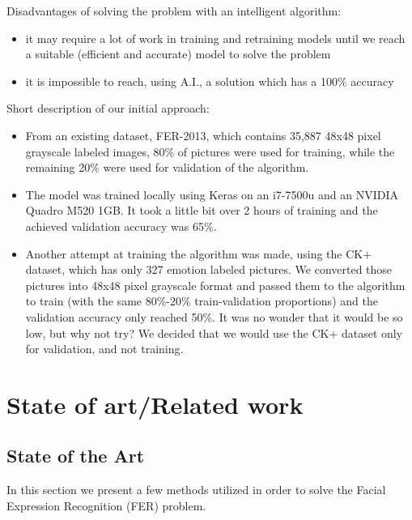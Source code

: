\documentclass[runningheads,a4paper,11pt]{report}
\begin{document}
Disadvantages of solving the problem with an intelligent algorithm:
\begin{itemize}
	\item it may require a lot of work in training and retraining models until we reach a suitable (efficient and accurate) model to solve the problem
	\item it is impossible to reach, using A.I., a solution which has a 100\% accuracy
\end{itemize}

\pagebreak
Short description of our initial approach:
\begin{itemize}
	\item From an existing dataset, FER-2013, which contains 35,887 48x48 pixel grayscale labeled images, 80\% of pictures were used for training, while the remaining 20\% were used for validation of the algorithm.
	\item The model was trained locally using Keras on an i7-7500u and an NVIDIA Quadro M520 1GB. It took a little bit over 2 hours of training and the achieved validation accuracy was 65\%.
	\item Another attempt at training the algorithm was made, using the CK+ dataset, which has only 327 emotion labeled pictures. We converted those pictures into 48x48 pixel grayscale format and passed them to the algorithm to train (with the same 80\%-20\% train-validation proportions) and the validation accuracy only reached 50\%. It was no wonder that it would be so low, but why not try? We decided that we would use the CK+ dataset only for validation, and not training.
\end{itemize}


\chapter{State of art/Related work}
\label{chapter:stateOfArt}


\section{State of the Art}
\label{section:soa}

In this section we present a few methods utilized in order to solve the Facial Expression Recognition (FER) problem.
\end{document}
